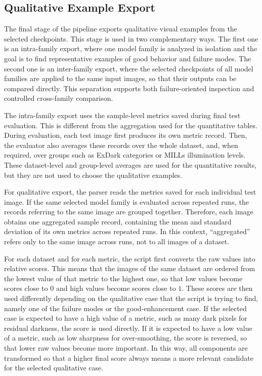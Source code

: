 \subsection{Qualitative Example Export}

The final stage of the pipeline exports qualitative visual examples from the selected checkpoints. This stage is used in two complementary ways. The first one is an intra-family export, where one model family is analyzed in isolation and the goal is to find representative examples of good behavior and failure modes. The second one is an inter-family export, where the selected checkpoints of all model families are applied to the same input images, so that their outputs can be compared directly. This separation supports both failure-oriented inspection and controlled cross-family comparison.

The intra-family export uses the sample-level metrics saved during final test evaluation. This is different from the aggregation used for the quantitative tables. During evaluation, each test image first produces its own metric record. Then, the evaluator also averages these records over the whole dataset, and, when required, over groups such as ExDark categories or MILLs illumination levels. These dataset-level and group-level averages are used for the quantitative results, but they are not used to choose the qualitative examples.

For qualitative export, the parser reads the metrics saved for each individual test image. If the same selected model family is evaluated across repeated runs, the records referring to the same image are grouped together. Therefore, each image obtains one aggregated sample record, containing the mean and standard deviation of its own metrics across repeated runs. In this context, ``aggregated'' refers only to the same image across runs, not to all images of a dataset.

For each dataset and for each metric, the script first converts the raw values into relative scores. This means that the images of the same dataset are ordered from the lowest value of that metric to the highest one, so that low values become scores close to $0$ and high values become scores close to $1$. These scores are then used differently depending on the qualitative case that the script is trying to find, namely one of the failure modes or the good-enhancement case. If the selected case is expected to have a high value of a metric, such as many dark pixels for residual darkness, the score is used directly. If it is expected to have a low value of a metric, such as low sharpness for over-smoothing, the score is reversed, so that lower raw values become more important. In this way, all components are transformed so that a higher final score always means a more relevant candidate for the selected qualitative case.

